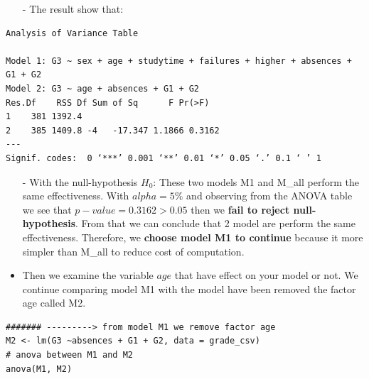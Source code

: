 \documentclass[a4paper]{article}
\numberwithin{equation}{section}
\begin{document}
\begin{itemize}
  \item [-] The result show that:
\end{itemize}
\begin{mdframed}[leftline=false,rightline=false,backgroundcolor=teal!10,nobreak=true]
  \begin{verbatim}
Analysis of Variance Table

Model 1: G3 ~ sex + age + studytime + failures + higher + absences + G1 + G2
Model 2: G3 ~ age + absences + G1 + G2
Res.Df    RSS Df Sum of Sq      F Pr(>F)
1    381 1392.4
2    385 1409.8 -4   -17.347 1.1866 0.3162
---
Signif. codes:  0 ‘***’ 0.001 ‘**’ 0.01 ‘*’ 0.05 ‘.’ 0.1 ‘ ’ 1
  \end{verbatim}
\end{mdframed}

\begin{itemize}
  \item[-] With the null-hypothesis \(H_0\): These two models M1 and M\_all perform the same effectiveness.
  With \(alpha = 5\% \) and observing from the ANOVA table we see that \(p-value = 0.3162 > 0.05\) then we \textbf{fail to reject null-hypothesis}. From that we can conclude that 2 model are perform the same effectiveness. Therefore, we \textbf{choose model M1 to continue} because it more simpler than M\_all to reduce cost of computation.
\end{itemize}

\begin{itemize}
  \item Then we examine the variable \(age\) that have effect on your model or not. We continue comparing model M1 with the model have been removed the factor age called M2.
\end{itemize}

\begin{mdframed}[leftline=false,rightline=false,backgroundcolor=magenta!10,nobreak=true]
  \begin{verbatim}
####### ---------> from model M1 we remove factor age
M2 <- lm(G3 ~absences + G1 + G2, data = grade_csv)
# anova between M1 and M2
anova(M1, M2)
  \end{verbatim}
\end{mdframed}
\end{document}
